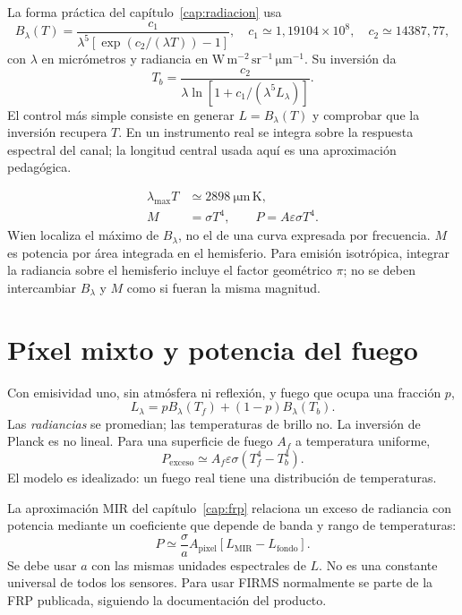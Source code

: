 La forma práctica del capítulo~\ref{cap:radiacion} usa
\begin{equation}
 B_\lambda(T)=\frac{c_1}{\lambda^5[\exp(c_2/(\lambda T))-1]},\quad
 c_1\simeq1{,}19104\times10^8,\quad c_2\simeq14387{,}77,
\end{equation}
con $\lambda$ en micrómetros y radiancia en
$\mathrm{W\,m^{-2}\,sr^{-1}\,\mu m^{-1}}$. Su inversión da
\begin{equation}
 T_b=\frac{c_2}{\lambda\ln[1+c_1/(\lambda^5L_\lambda)]}.
\end{equation}
El control más simple consiste en generar $L=B_\lambda(T)$ y comprobar que la inversión
recupera $T$. En un instrumento real se integra sobre la respuesta espectral del canal;
la longitud central usada aquí es una aproximación pedagógica.

\begin{align}
 \lambda_{\max}T&\simeq2898\ \mathrm{\mu m\,K},\\
 M&=\sigma T^4,\qquad P=A\varepsilon\sigma T^4.
\end{align}
Wien localiza el máximo de $B_\lambda$, no el de una curva expresada por frecuencia.
$M$ es potencia por área integrada en el hemisferio. Para emisión isotrópica, integrar
la radiancia sobre el hemisferio incluye el factor geométrico $\pi$; no se deben
intercambiar $B_\lambda$ y $M$ como si fueran la misma magnitud.

\section{Píxel mixto y potencia del fuego}

Con emisividad uno, sin atmósfera ni reflexión, y fuego que ocupa una fracción $p$,
\begin{equation}
 L_\lambda=pB_\lambda(T_f)+(1-p)B_\lambda(T_b).
\end{equation}
Las \emph{radiancias} se promedian; las temperaturas de brillo no. La inversión de
Planck es no lineal. Para una superficie de fuego $A_f$ a temperatura uniforme,
\begin{equation}
 P_{\mathrm{exceso}}\simeq A_f\varepsilon\sigma(T_f^4-T_b^4).
\end{equation}
El modelo es idealizado: un fuego real tiene una distribución de temperaturas.

La aproximación MIR del capítulo~\ref{cap:frp} relaciona un exceso de radiancia con
potencia mediante un coeficiente que depende de banda y rango de temperaturas:
\begin{equation}
 P\simeq\frac{\sigma}{a}A_{\mathrm{pixel}}
 [L_{\mathrm{MIR}}-L_{\mathrm{fondo}}].
\end{equation}
Se debe usar $a$ con las mismas unidades espectrales de $L$. No es una constante
universal de todos los sensores. Para usar FIRMS normalmente se parte de la FRP
publicada, siguiendo la documentación del producto.

